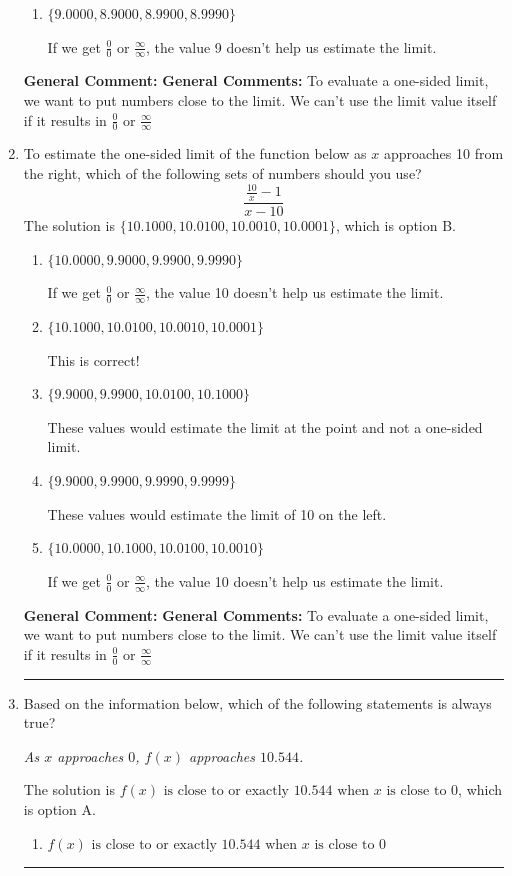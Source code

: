 \documentclass{extbook}[14pt]
\newcommand{\litem}[1]{\item #1

\rule{\textwidth}{0.4pt}}
\begin{document}
\begin{enumerate}
{\begin{enumerate}[label=\Alph*.]
These values would estimate the limit at the point and not a one-sided limit.
\item \( \{ 9.0000, 8.9000, 8.9900, 8.9990 \} \)

If we get $\frac{0}{0}$ or $\frac{\infty}{\infty}$, the value 9 doesn't help us estimate the limit.
\end{enumerate}

\textbf{General Comment:} \textbf{General Comments:} To evaluate a one-sided limit, we want to put numbers close to the limit. We can't use the limit value itself if it results in $\frac{0}{0}$ or $\frac{\infty}{\infty}$
}
\litem{
To estimate the one-sided limit of the function below as $x$ approaches 10 from the right, which of the following sets of numbers should you use?
\[ \frac{\frac{10}{x} - 1}{x - 10} \]The solution is \( \{ 10.1000, 10.0100, 10.0010, 10.0001 \} \), which is option B.\begin{enumerate}[label=\Alph*.]
\item \( \{ 10.0000, 9.9000, 9.9900, 9.9990 \} \)

If we get $\frac{0}{0}$ or $\frac{\infty}{\infty}$, the value 10 doesn't help us estimate the limit.
\item \( \{ 10.1000, 10.0100, 10.0010, 10.0001 \} \)

This is correct!
\item \( \{ 9.9000, 9.9900, 10.0100, 10.1000 \} \)

These values would estimate the limit at the point and not a one-sided limit.
\item \( \{ 9.9000, 9.9900, 9.9990, 9.9999 \} \)

These values would estimate the limit of 10 on the left.
\item \( \{ 10.0000, 10.1000, 10.0100, 10.0010 \} \)

If we get $\frac{0}{0}$ or $\frac{\infty}{\infty}$, the value 10 doesn't help us estimate the limit.
\end{enumerate}

\textbf{General Comment:} \textbf{General Comments:} To evaluate a one-sided limit, we want to put numbers close to the limit. We can't use the limit value itself if it results in $\frac{0}{0}$ or $\frac{\infty}{\infty}$
}
\litem{
Based on the information below, which of the following statements is always true?

\begin{center}
    \textit{ As $x$ approaches $0$, $f(x)$ approaches $10.544$. }
\end{center}
The solution is \( f(x) \text{ is close to or exactly } 10.544 \text{ when } x \text{ is close to } 0 \), which is option A.\begin{enumerate}[label=\Alph*.]
\item \( f(x) \text{ is close to or exactly } 10.544 \text{ when } x \text{ is close to } 0 \)



\end{enumerate}}
\end{enumerate}
\end{document}
